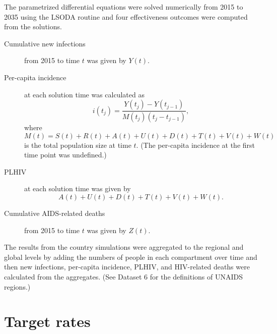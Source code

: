 \documentclass{article}
\begin{document}
The parametrized differential equations were solved numerically from
2015 to 2035 using the LSODA
routine \cite{odepack, scipy, medlock2016-git} and four effectiveness
outcomes were computed from the solutions.
\begin{description}
\item[Cumulative new infections] from 2015 to time $t$ was given by
  $Y(t)$.

\item[Per-capita incidence] at each solution time was calculated as
  \begin{equation}
    i(t_j) = \frac{Y(t_j) - Y(t_{j - 1})}{M(t_j) (t_j - t_{j - 1})},
  \end{equation}
  where
  \begin{equation}
    M(t) = S(t) + R(t) + A(t) + U(t) + D(t) + T(t) + V(t) + W(t)
  \end{equation}
  is the total population size at time $t$.  (The per-capita incidence
  at the first time point was undefined.)

\item[PLHIV] at each solution time was given by
  \begin{equation}
    A(t) + U(t) + D(t) + T(t) + V(t) + W(t).
  \end{equation}

\item[Cumulative AIDS-related deaths] from 2015 to time $t$ was given
  by $Z(t)$.

\end{description}

The results from the country simulations were aggregated to the
regional and global levels by adding the numbers of people in each
compartment over time and then new infections, per-capita incidence,
PLHIV, and HIV-related deaths were calculated from the aggregates.
(See Dataset 6 for the definitions of UNAIDS regions.)


\section{Target rates}
\label{targets}
\end{document}
